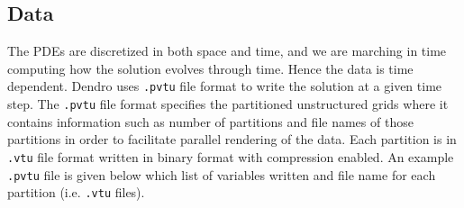 \subsection{Data}
The PDEs are discretized in both space and time, and we are marching in time computing how the solution evolves through time. Hence the data is time dependent. Dendro uses \texttt{.pvtu} file format to write the solution at a given time step. The \texttt{.pvtu} file format specifies the partitioned unstructured grids where it contains information such as number of partitions and file names of those partitions in order to facilitate parallel rendering of the data. Each partition is in \texttt{.vtu} file format written in binary format with compression enabled. An example \texttt{.pvtu} file is given below which list of variables written and file name for each partition (i.e. \texttt{.vtu} files). 

